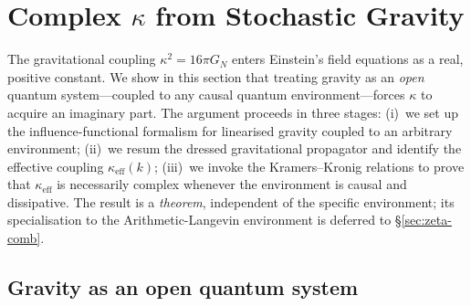\documentclass[12pt,a4paper]{article}
\begin{document}



\section{Complex $\kappa$ from Stochastic Gravity}\label{sec:complex-kappa}

The gravitational coupling $\kappa^{2}=16\pi G_{N}$ enters Einstein's
field equations as a real, positive constant.  We show in this section
that treating gravity as an \emph{open} quantum system---coupled to any
causal quantum environment---forces $\kappa$ to acquire an imaginary
part.  The argument proceeds in three stages: (i)~we set up the
influence-functional formalism for linearised gravity coupled to an
arbitrary environment; (ii)~we resum the dressed gravitational
propagator and identify the effective coupling
$\kappa_{\mathrm{eff}}(k)$; (iii)~we invoke the Kramers--Kronig
relations to prove that $\kappa_{\mathrm{eff}}$ is necessarily complex
whenever the environment is causal and dissipative.  The result is a
\emph{theorem}, independent of the specific environment; its
specialisation to the Arithmetic-Langevin environment is deferred to
\S\ref{sec:zeta-comb}.

\subsection{Gravity as an open quantum system}\label{ssec:open-gravity}
\end{document}
